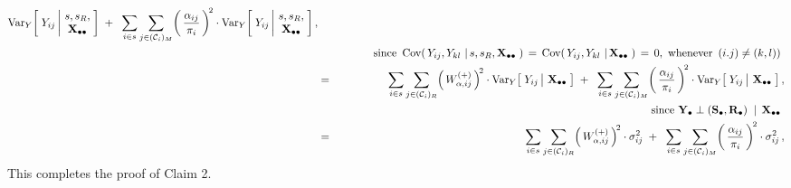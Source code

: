 \begin{enumerate}
\begin{eqnarray*}
        \Var_{Y}\!\left[\;
            Y_{ij}
            \left\vert\!
            \begin{array}{c} s,s_{R}, \\ \Xobs \end{array}
            \right.
            \!\!\right]
        \; + \;\;
        \underset{i \in s}{\sum}\,
        \underset{j \in (\mathcal{C}_{i})_{M}}{\sum}\!
        \left(\,
            \dfrac{ \alpha_{ij} }{ \pi_{i} }
            \,\right)^{\!2}
        \cdot
        \Var_{Y}\!\left[\;
            Y_{ij}
            \left\vert\!
            \begin{array}{c} s,s_{R}, \\ \Xobs \end{array}
            \right.
            \!\!\right],
    \\
    &&
        \quad\quad\quad
        \textnormal{since
            \,$
            \Cov\!\left(\,Y_{ij},Y_{kl}\,\left\vert\,s,s_{R},\Xobs\right.\,\right)
            \,=\,
            \Cov\!\left(\,Y_{ij},Y_{kl}\,\left\vert\,\Xobs\right.\,\right)
            \,=\,
            0$,\,
            whenever \,$(i.j) \neq (k,l))$
            }
    \\
    & = &
        \underset{i \in s}{\sum}\,
        \underset{j \in (\mathcal{C}_{i})_{R}}{\sum}\!
        \left(\,W^{(+)}_{\alpha,ij}\,\right)^{\!2}
        \cdot
        \Var_{Y}\!\left[\;
            Y_{ij}
            \left\vert\!
            \begin{array}{c} \Xobs \end{array}
            \right.
            \!\!\right]
        \; + \;\;
        \underset{i \in s}{\sum}\,
        \underset{j \in (\mathcal{C}_{i})_{M}}{\sum}\!
        \left(\,
            \dfrac{ \alpha_{ij} }{ \pi_{i} }
            \,\right)^{\!2}
        \cdot
        \Var_{Y}\!\left[\;
            Y_{ij}
            \left\vert\!
            \begin{array}{c} \Xobs \end{array}
            \right.
            \!\!\right],
    \\
    &&
        \quad\quad\quad
        \textnormal{since
            $\Ydot \perp (\Sdot,\Rdot) \;\;\vert\;\, \Xobs$
            }
    \\
    & = &
        \underset{i \in s}{\sum}\,
        \underset{j \in (\mathcal{C}_{i})_{R}}{\sum}\!
        \left(\,W^{(+)}_{\alpha,ij}\,\right)^{\!2}
        \cdot
        \sigma^{2}_{ij}
        \; + \;\;
        \underset{i \in s}{\sum}\,
        \underset{j \in (\mathcal{C}_{i})_{M}}{\sum}\!
        \left(\,
            \dfrac{ \alpha_{ij} }{ \pi_{i} }
            \,\right)^{\!2}
        \cdot
        \sigma^{2}_{ij}\,,
    \end{eqnarray*}
    This completes the proof of Claim 2.


\end{enumerate}
